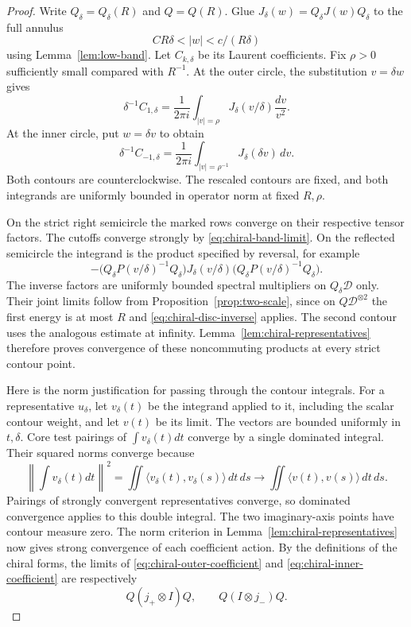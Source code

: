\begin{proof}
Write $Q_\delta=Q_\delta(R)$ and $Q=Q(R)$. Glue
$J_\delta(w)=Q_\delta J(w)Q_\delta$ to the full annulus
\[
                  CR\delta<|w|<c/(R\delta)
\]
using Lemma~\ref{lem:low-band}. Let $C_{k,\delta}$ be its Laurent
coefficients. Fix $\rho>0$ sufficiently small compared with $R^{-1}$.
At the outer circle, the substitution $v=\delta w$ gives
\begin{equation}\label{eq:chiral-outer-coefficient}
 \delta^{-1}C_{1,\delta}
    =\frac1{2\pi i}\int_{|v|=\rho}
                  J_\delta(v/\delta)\frac{dv}{v^2}.
\end{equation}
At the inner circle, put $w=\delta v$ to obtain
\begin{equation}\label{eq:chiral-inner-coefficient}
 \delta^{-1}C_{-1,\delta}
    =\frac1{2\pi i}\int_{|v|=\rho^{-1}}
                              J_\delta(\delta v)\,dv.
\end{equation}
Both contours are counterclockwise. The rescaled contours are fixed, and
both integrands are uniformly bounded in operator norm at fixed $R,\rho$.

On the strict right semicircle the marked rows converge on their respective
tensor factors. The cutoffs converge strongly by
\eqref{eq:chiral-band-limit}. On the reflected semicircle the integrand is
the product specified by reversal, for example
\[
 -\bigl(Q_\delta P(v/\delta)^{-1}Q_\delta\bigr)
     J_\delta(v/\delta)
     \bigl(Q_\delta P(v/\delta)^{-1}Q_\delta\bigr).
\]
The inverse factors are uniformly bounded spectral multipliers on
$Q_\delta\mathcal D$ only. Their joint limits follow from
Proposition~\ref{prop:two-scale}, since on $Q\mathcal D^{\otimes2}$
the first energy is at most $R$ and \eqref{eq:chiral-disc-inverse}
applies. The second contour uses the analogous estimate at infinity.
Lemma~\ref{lem:chiral-representatives} therefore proves convergence of
these noncommuting products at every strict contour point.

Here is the norm justification for passing through the contour integrals.
For a representative $u_\delta$, let $v_\delta(t)$ be the integrand
applied to it, including the scalar contour weight, and let $v(t)$ be
its limit. The vectors are bounded uniformly in $t,\delta$. Core test
pairings of $\int v_\delta(t)dt$ converge by a single dominated integral.
Their squared norms converge because
\begin{equation}\label{eq:chiral-double-contour}
 \left\|\int v_\delta(t)dt\right\|^2
 =\iint\langle v_\delta(t),v_\delta(s)\rangle\,dt\,ds
 \longrightarrow
 \iint\langle v(t),v(s)\rangle\,dt\,ds.
\end{equation}
Pairings of strongly convergent representatives converge, so dominated
convergence applies to this double integral. The two imaginary-axis points
have contour measure zero. The norm criterion in
Lemma~\ref{lem:chiral-representatives} now gives strong convergence of
each coefficient action. By the definitions of the chiral forms, the
limits of \eqref{eq:chiral-outer-coefficient} and
\eqref{eq:chiral-inner-coefficient} are respectively
\[
                 Q(j_+\otimes I)Q,
                   \qquad Q(I\otimes j_-)Q.
\]


\end{proof}
